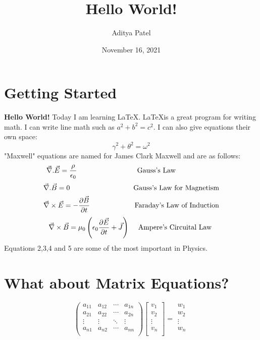 \documentclass{article}
\title{Hello World!}
\author{Aditya Patel}
\date{November 16, 2021}
\newcommand\tab[1][1cm]{\hspace*{#1}}
\begin{document}

\maketitle

\section{Getting Started}
\textbf{Hello World!} Today I am learning \LaTeX . \LaTeX is a great program for writing math. I can write line math such as $ a^{2}+b^{2}=c^{2} $. I can also give equations their own space: 
\begin{equation}
   \gamma^{2} + \theta^{2}=\omega^{2}    
\end{equation}
"Maxwell" equations are named for James Clark Maxwell and are as follows:\\
\begin{equation}
   \tab \:\: \: \Vec{ \nabla}.\Vec{E}  =\frac{\rho}{\epsilon_0} \tab \tab \tab    \text{Gauss's Law} \tab \tab \tab \:\:\:
\end{equation}
\begin{equation}
    \Vec{ \nabla}.\Vec{B}  =0 \tab \tab \tab \: \: \text{Gauss's Law for Magnetism}
\end{equation}
\begin{equation}
    \Vec{ \nabla}\times\Vec{E}  =-\frac{\partial \Vec{B}}{\partial t} \tab \tab \: \: \:  \text{Faraday's Law of Induction} 
\end{equation}
\begin{equation}
    \tab  \quad \Vec{ \nabla}\times\Vec{B}=\mu_0 \left( \epsilon_0\frac{\partial \Vec{E}}{\partial t} + \Vec{J} \right)  \quad  \: \text{Ampere's Circuital Law} \tab  \quad \:
\end{equation}
Equations 2,3,4 and 5 are some of the most important in Physics.
\section{What about Matrix Equations?}
\[
\begin{pmatrix}
a_{11}&a_{12}&\cdots&a_{1n}\\
a_{21}&a_{22}&\cdots&a_{2n}\\
\vdots&\vdots&\ddots&\vdots \\
a_{n1}&a_{n2}&\cdots&a_{nn}\\
\end{pmatrix}
\begin{bmatrix}
v_1\\
v_2\\
\vdots\\
v_n\\
\end{bmatrix}
=
\begin{matrix}
w_1\\
w_2\\
\vdots\\
w_n\\
\end{matrix}
\]
\end{document}
